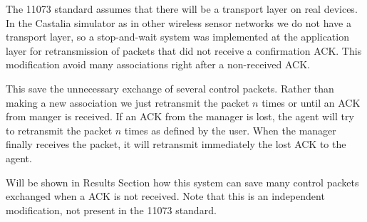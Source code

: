 The 11073 standard assumes that there will be a transport layer on real devices. In the Castalia simulator as in other wireless sensor networks we do not have a transport layer, so a stop-and-wait system was implemented at the application layer for retransmission of packets that did not receive a confirmation ACK. This modification avoid many associations right after a non-received ACK.

This save the unnecessary exchange of several control packets. Rather than making a new association we just retransmit the packet $n$ times or until an ACK from manger is received.
If an ACK from the manager is lost, the agent will try to retransmit the packet $n$ times as defined by the user. When the manager finally receives the packet, it will retransmit immediately the lost ACK to the agent.

Will be shown in Results Section how this system can save many control packets exchanged when a ACK is not received. Note that this is an independent modification, not present in the 11073 standard. 
